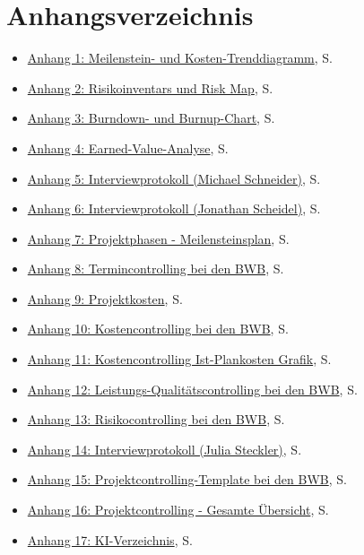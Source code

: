 \documentclass[
    12pt, 
    a4paper,
    ]{scrartcl} %
\begin{document}
\section*{Anhangsverzeichnis}
{}
\vspace{0.6cm}
\begin{itemize}
    \item \hyperref[sec:Anhang1]{Anhang 1: Meilenstein- und Kosten-Trenddiagramm}, S. \pageref{sec:Anhang1}
    \item \hyperref[sec:Anhang2]{Anhang 2: Risikoinventars und Risk Map}, S. \pageref{sec:Anhang2}
    \item \hyperref[sec:Anhang3]{Anhang 3: Burndown- und Burnup-Chart}, S. \pageref{sec:Anhang3}
    \item \hyperref[sec:Anhang4]{Anhang 4: Earned-Value-Analyse}, S. \pageref{sec:Anhang4}
    \item \hyperref[sec:Anhang5]{Anhang 5: Interviewprotokoll (Michael Schneider)}, S. \pageref{sec:Anhang5}
    \item \hyperref[sec:Anhang6]{Anhang 6: Interviewprotokoll (Jonathan Scheidel)}, S. \pageref{sec:Anhang6}
    \item \hyperref[sec:Anhang7]{Anhang 7: Projektphasen - Meilensteinsplan}, S. \pageref{sec:Anhang7}
    \item \hyperref[sec:Anhang8]{Anhang 8: Termincontrolling bei den BWB}, S. \pageref{sec:Anhang8}
    \item \hyperref[sec:Anhang9]{Anhang 9: Projektkosten}, S. \pageref{sec:Anhang9}
    \item \hyperref[sec:Anhang10]{Anhang 10: Kostencontrolling bei den BWB}, S. \pageref{sec:Anhang10}
    \item \hyperref[sec:Anhang11]{Anhang 11: Kostencontrolling Ist-Plankosten Grafik}, S. \pageref{sec:Anhang11}
    \item \hyperref[sec:Anhang12]{Anhang 12: Leistungs-Qualitätscontrolling bei den BWB}, S. \pageref{sec:Anhang12}
    \item \hyperref[sec:Anhang13]{Anhang 13: Risikocontrolling bei den BWB}, S. \pageref{sec:Anhang13}
    \item \hyperref[sec:Anhang14]{Anhang 14: Interviewprotokoll (Julia Steckler)}, S. \pageref{sec:Anhang14}
    \item \hyperref[sec:Anhang15]{Anhang 15: Projektcontrolling-Template bei den BWB}, S. \pageref{sec:Anhang15}
    \item \hyperref[sec:Anhang16]{Anhang 16: Projektcontrolling - Gesamte Übersicht}, S. \pageref{sec:Anhang16}
    \item \hyperref[sec:Anhang17]{Anhang 17: KI-Verzeichnis}, S. \pageref{sec:Anhang17}

\end{itemize}
\end{document}
